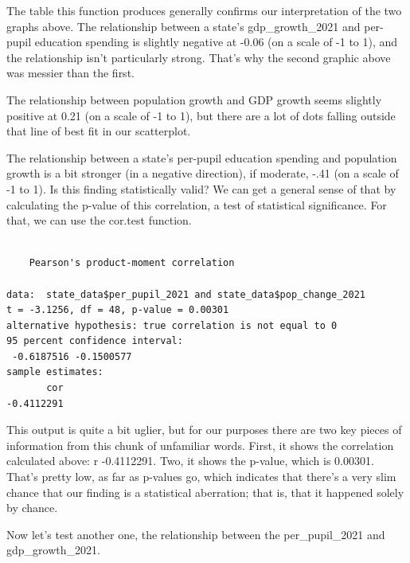 \documentclass[
  letterpaper,
  DIV=11,
  numbers=noendperiod]{scrreprt}
\newenvironment{Shaded}{\begin{snugshade}}{\end{snugshade}}
\newcommand{\FunctionTok}[1]{\textcolor[rgb]{0.28,0.35,0.67}{#1}}
\newcommand{\NormalTok}[1]{\textcolor[rgb]{0.00,0.23,0.31}{#1}}
\newcommand{\SpecialCharTok}[1]{\textcolor[rgb]{0.37,0.37,0.37}{#1}}
\begin{document}
The table this function produces generally confirms our interpretation
of the two graphs above. The relationship between a state's
gdp\_growth\_2021 and per-pupil education spending is slightly negative
at -0.06 (on a scale of -1 to 1), and the relationship isn't
particularly strong. That's why the second graphic above was messier
than the first.

The relationship between population growth and GDP growth seems slightly
positive at 0.21 (on a scale of -1 to 1), but there are a lot of dots
falling outside that line of best fit in our scatterplot.

The relationship between a state's per-pupil education spending and
population growth is a bit stronger (in a negative direction), if
moderate, -.41 (on a scale of -1 to 1). Is this finding statistically
valid? We can get a general sense of that by calculating the p-value of
this correlation, a test of statistical significance. For that, we can
use the cor.test function.

\begin{Shaded}
\end{Shaded}

\begin{verbatim}

    Pearson's product-moment correlation

data:  state_data$per_pupil_2021 and state_data$pop_change_2021
t = -3.1256, df = 48, p-value = 0.00301
alternative hypothesis: true correlation is not equal to 0
95 percent confidence interval:
 -0.6187516 -0.1500577
sample estimates:
       cor 
-0.4112291 
\end{verbatim}

This output is quite a bit uglier, but for our purposes there are two
key pieces of information from this chunk of unfamiliar words. First, it
shows the correlation calculated above: r -0.4112291. Two, it shows the
p-value, which is 0.00301. That's pretty low, as far as p-values go,
which indicates that there's a very slim chance that our finding is a
statistical aberration; that is, that it happened solely by chance.

Now let's test another one, the relationship between the
per\_pupil\_2021 and gdp\_growth\_2021.
\end{document}
